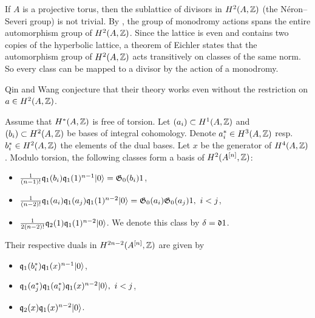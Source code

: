 \begin{remark}
If $A$ is a projective torus, then the sublattice of divisors in $H^2(A,\mathbb{Z})$ (the N\'eron--Severi group) is not trivial. By \cite[Thm.~II]{Shioda}, the group of monodromy actions spans the entire automorphism group of $H^2(A,\mathbb{Z})$.
Since the lattice is even and contains two copies of the hyperbolic lattice, a theorem of Eichler \cite[Prop.~3.7.3]{Scattone} states that the automorphism group of $H^2(A,\mathbb{Z})$ acts transitively on classes of the same norm. So every class can be mapped to a divisor by the action of a monodromy.
\end{remark}
\begin{remark}
Qin and Wang \cite[Thm 1.1 et seq.]{QinWang} conjecture that their theory works even without the restriction on $a\in H^2(A,\mathbb{Z})$. 
\end{remark}
\begin{proposition} Assume that $H^*(A,\mathbb{Z})$ is free of torsion.
Let $(a_i) \subset H^1(A,\mathbb{Z})$ and $(b_i)\subset H^2(A,\mathbb{Z})$ be bases of integral cohomology. Denote $a_i^*\in H^3(A,\mathbb{Z})$ resp.~$b_i^*\in H^2(A,\mathbb{Z})$ the elements of the dual bases. Let $x$ be the generator of $H^4(A,\mathbb{Z})$. Modulo torsion, the following classes form a basis of $H^2(A^{[n]},\mathbb{Z})$:
\begin{itemize}
 \item $\frac{1}{(n-1)!}\mathfrak{q}_{1}(b_{i})\mathfrak{q}_{1}(1)^{n-1}|0\rangle = \mathfrak{G}_0(b_i) 1$,
 \item $ \frac{1}{(n-2)!}\mathfrak{q}_{1}(a_{i})\mathfrak{q}_{1}(a_{j})\mathfrak{q}_{1}(1)^{n-2}|0\rangle = \mathfrak{G}_0(a_i) \mathfrak{G}_0(a_j)1,\  i < j$, 
 \item $ \frac{1}{2(n-2)!}\mathfrak{q}_{2}(1) \mathfrak{q}_{1}(1)^{n-2}|0\rangle$. We denote this class by $\delta = \mathfrak{d} 1$.
\end{itemize}
Their respective duals in $H^{2n-2}(A^{[n]},\mathbb{Z})$ are given by
\begin{itemize}
 \item $\mathfrak{q}_{1}(b_{i}^*)\mathfrak{q}_{1}(x)^{n-1}|0\rangle$,
 \item $\mathfrak{q}_{1}(a_{j}^*)\mathfrak{q}_{1}(a_{i}^*)\mathfrak{q}_{1}(x)^{n-2}|0\rangle,\  i < j$,
 \item $\mathfrak{q}_2(x)\mathfrak{q}_{1}(x)^{n-2} |0\rangle$.
\end{itemize}
\end{proposition}
